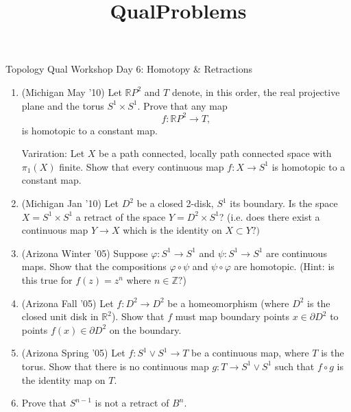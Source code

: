 \documentclass[psamsfonts, 11pt, reqno]{amsart}
\title{QualProblems}
\renewcommand{\phi}{\varphi}
\begin{document}
\begin{center}
\begin{large}
Topology Qual Workshop Day 6: Homotopy \& Retractions
\end{large}
\end{center}
\vspace{.25in}

\begin{enumerate}

\item (Michigan May '10) Let $\mathbb{R}P^2$ and $T$ denote, in this order,
the real projective plane and the torus $S^1 \times S^1$.  Prove that any map
$$f:\mathbb{R}P^2 \rightarrow T,$$
is homotopic to a constant map.

\vspace{.2in}
\noindent
Variration: Let $X$ be a path connected, locally path connected space with 
$\pi_1 (X)$ finite.  Show that every continuous map $f: X \rightarrow S^1$
is homotopic to a constant map. 

\vfill

\item (Michigan Jan '10) Let $D^2$ be a closed 2-disk, $S^1$ its boundary.  Is
the space $X = S^1 \times S^1$ a retract of the space $Y = D^2 \times S^1$? (i.e.
does there exist a continuous map $Y \rightarrow X$ which is the identity on $X \subset Y?)$

\vfill

\item (Arizona Winter '05) Suppose $\phi : S^1 \rightarrow S^1$ and
$\psi : S^1 \rightarrow S^1$ are continuous maps.  Show that the compositions
$\phi \circ \psi$ and $\psi \circ \phi$ are homotopic. (Hint: is
this true for $f(z) = z^n$ where $n \in \mathbb{Z}?$)

\vfill
\item (Arizona Fall '05) Let $f: D^2 \rightarrow D^2$ be a homeomorphism (where
$D^2$ is the closed unit disk in $\mathbb{R}^2$).  Show that $f$
must map boundary points $x \in \partial D^2$ to points $f(x) \in \partial D^2$
on the boundary.

\vfill

\item (Arizona Spring '05) Let $f: S^1 \vee S^1 \rightarrow T$ be a continuous map, where $T$ is the torus.  Show that there is no continuous map
$g: T \rightarrow S^1 \vee S^1$ such that
$f\circ g$ is the identity map on $T$.

\vfill

\item Prove that $S^{n-1}$ is not a retract of $B^n$.

\vfill


\end{enumerate}
\end{document}
